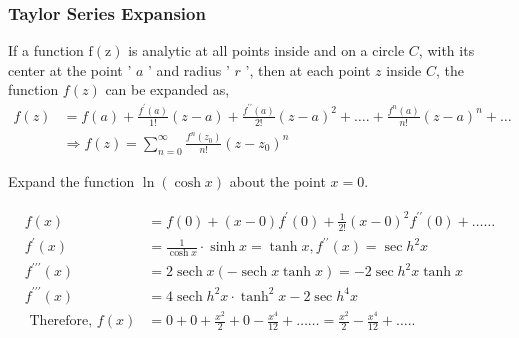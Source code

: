 \subsubsection{Taylor Series Expansion}
If a function $\mathrm{f}(\mathrm{z})$ is analytic at all points inside and on a circle $C$, with its center at the point ' $a$ ' and radius ' $r$ ', then at each point $z$ inside $C$, the function $f(z)$ can be expanded as,
\begin{align*}
	f(z) &=f(a)+\frac{f^{\prime}(a)}{1 !}(z-a)+\frac{f^{\prime \prime}(a)}{2 !}(z-a)^{2}+\ldots .+\frac{f^{n}(a)}{n !}(z-a)^{n}+\ldots \\
	& \Rightarrow f(z)=\sum_{n=0}^{\infty} \frac{f^{n}\left(z_{0}\right)}{n !}\left(z-z_{0}\right)^{n}
\end{align*}
\begin{exercise}
	Expand the function $\ln (\cosh x)$ about the point $x=0$.
\end{exercise}
\begin{answer}
	\begin{align*}
	\begin{aligned}
	f(x)&=f(0)+(x-0) f^{\prime}(0)+\frac{1}{2 !}(x-0)^{2} f^{\prime \prime}(0)+\ldots \ldots \\
	f^{\prime}(x)&=\frac{1}{\cosh x} \cdot \sinh x=\tanh x, f^{\prime \prime}(x)=\sec h^{2} x \\
	f^{\prime \prime \prime}(x)&=2 \operatorname{sech} x(-\operatorname{sech} x \tanh x)=-2 \sec h^{2} x \tanh x \\
	f^{\prime \prime \prime}(x)&=4 \operatorname{sech} h^{2} x \cdot \tanh ^{2} x-2 \sec h^{4} x\\
	\text { Therefore, } f(x)&=0+0+\frac{x^{2}}{2}+0-\frac{x^{4}}{12}+\ldots \ldots=\frac{x^{2}}{2}-\frac{x^{4}}{12}+\ldots . .
	\end{aligned}
	\end{align*}
\end{answer}

